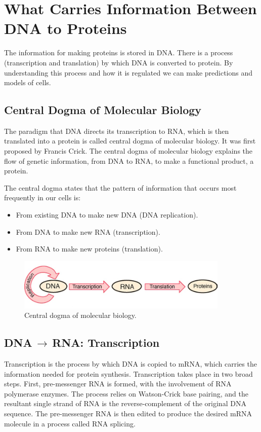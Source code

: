 \section{What Carries Information Between DNA to Proteins}
The information for making proteins is stored in DNA. There is a process (transcription and translation) by which DNA is converted to protein. By understanding this process and how it is regulated we can make predictions and models of cells.

\subsection{Central Dogma of Molecular Biology}
The paradigm that DNA directs its transcription to RNA, which is then translated into a protein is called central dogma of molecular biology. It was first proposed by Francis Crick. The central dogma of molecular biology explains the flow of genetic information, from DNA to RNA, to make a functional product, a protein.

The central dogma states that the pattern of information that occurs most frequently in our cells is:
\begin{itemize}
	\item From existing DNA to make new DNA (DNA replication).
	\item From DNA to make new RNA (transcription).
	\item From RNA to make new proteins (translation).
\end{itemize}

\begin{figure}[!tb]
	\centering
	\includegraphics[width=0.9\textwidth]{figures/dogma}
	\caption{Central dogma of molecular biology.}
	\label{fig:dogma}
\end{figure}

\subsection{DNA$\,\to\,$RNA: Transcription}
Transcription is the process by which DNA is copied to mRNA, which carries the information needed for protein synthesis. Transcription takes place in two broad steps. First, pre-messenger RNA is formed, with the involvement of RNA polymerase enzymes. The process relies on Watson-Crick base pairing, and the resultant single strand of RNA is the reverse-complement of the original DNA sequence. The pre-messenger RNA is then edited to produce the desired mRNA molecule in a process called RNA splicing.

